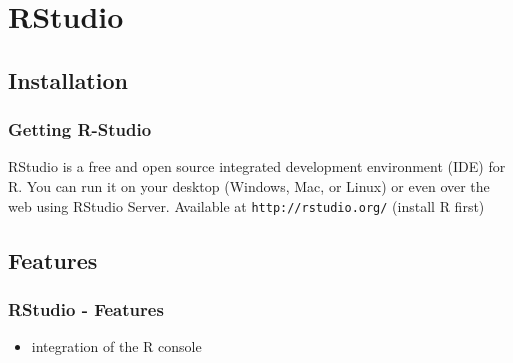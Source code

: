 \documentclass[xcolor={table}]{beamer}
\begin{document}
\section{RStudio}
\subsection{Installation}
\begin{frame}\frametitle{Getting R-Studio}
  RStudio is a free and open source integrated development environment (IDE) for R. You can run it on your desktop (Windows, Mac, or Linux) or even over the web using RStudio Server. Available at \texttt{http://rstudio.org/} (install R first)
\begin{center}
\end{center}
\end{frame}

\subsection{Features}
\begin{frame}\frametitle{RStudio - Features}
  \begin{itemize}
  \item integration of the R console
  \end{itemize}
\begin{center}
\end{center}
\end{frame}
\end{document}

